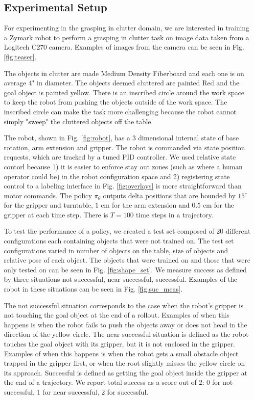 \documentclass[10pt, conference]{ieeeconf}      %
\begin{document}
\subsection{Experimental Setup}
For experimenting in the grasping in clutter domain, we are interested in training a Zymark robot to perform a grasping in clutter task on image data taken from a Logitech C270 camera. Examples of images from the camera can be seen in Fig. \ref{fig:teaser}.

The objects in clutter are made Medium Density Fiberboard and each one is on average 4" in diameter. The objects deemed cluttered are painted Red and the goal object is painted yellow. There is an inscribed circle around the work space to keep the robot from pushing the objects outside of the work space. The inscribed circle can make the task more challenging because the robot cannot simply "sweep" the cluttered objects off the table. 

The robot, shown in Fig. \ref{fig:robot}, has a 3 dimensional internal state of base rotation, arm extension and gripper. The robot is commanded via state position requests, which are tracked by a tuned PID controller. We used relative state contorl because 1) it is easier to enforce stay out zones (such as where a human operator could be) in the robot configuration space and 2) registering state control to a labeling interface in Fig. \ref{fig:overlays} is more straightforward than motor commands.   The policy $\pi_\theta$ outputs delta positions that are bounded by $15^\circ$ for the gripper and turntable, $1$ cm for the arm extension and $0.5$ cm for the gripper at each time step. There is $T=100$ time steps in a trajectory. 

To test the performance of a policy, we created a test set composed of 20 different configurations each containing objects that were not trained on.  The test set configurations varied in number of objects on the table, size of objects and relative pose of each object. The objects that were trained on and those that were only tested on can be seen in Fig. \ref{fig:shape_set}.  We measure success as defined by three situations not successful, near successful, successful. Examples of the robot in these situations can be seen in Fig. \ref{fig:suc_meas}. 

The not successful situation corresponds to the case when the robot's gripper is not touching the goal object at the end of a rollout. Examples of when this happens is when the robot fails to push the objects away or does not head in the direction of the yellow circle. The near successful situation is defined as the robot touches the goal object with its gripper, but it is not enclosed in the gripper. Examples of when this happens is when the robot gets a small obstacle object trapped in the gripper first, or when the root slightly misses the yellow circle on its approach. Successful is defined as getting the goal object inside the gripper at the end of a trajectory. We report total success as a score out of 2: 0 for not successful, 1 for near successful, 2 for successful. 
\end{document}
